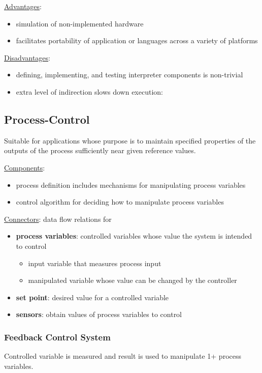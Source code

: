 \documentclass[11pt]{article}
\begin{document}
\uline{Advantages}:
\begin{itemize}
\item simulation of non-implemented hardware
\item facilitates portability of application or languages across
a variety of platforms
\end{itemize}

\uline{Disadvantages}:
\begin{itemize}
\item defining, implementing, and testing interpreter components
is non-trivial
\item extra level of indirection slows down execution:
\end{itemize}
\subsection{Process-Control}
\label{sec:orgc7bb5eb}
Suitable for applications whose purpose is to maintain
specified properties of the outputs of the process sufficiently
near given reference values.

\uline{Components}:
\begin{itemize}
\item process definition includes mechanisms for manipulating process
variables
\item control algorithm for deciding how to manipulate process
variables
\end{itemize}

\uline{Connectors}: data flow relations for
\begin{itemize}
\item \textbf{process variables}: controlled variables whose value the system
is intended to control
\begin{itemize}
\item input variable that measures process input
\item manipulated variable whose value can be changed by the controller
\end{itemize}
\item \textbf{set point}: desired value for a controlled variable
\item \textbf{sensors}: obtain values of process variables to control
\end{itemize}
\subsubsection{Feedback Control System}
\label{sec:org37201d0}
Controlled variable is measured and result is used to manipulate
1+ process variables.
\end{document}
